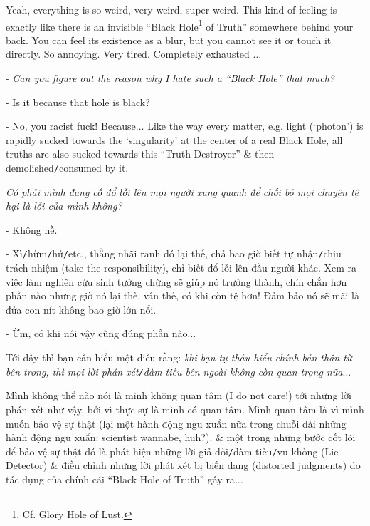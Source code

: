 \documentclass[12pt,oneside]{book}
\begin{document}
Yeah, everything is so weird, very weird, super weird. This kind of feeling is exactly like there is an invisible ``Black Hole\footnote{Cf. Glory Hole of {\sc Lust}.} of Truth'' somewhere behind your back. You can feel its existence as a blur, but you cannot see it or touch it directly. So annoying. Very tired. Completely exhausted $\ldots$

- {\it Can you figure out the reason why I hate such a ``Black Hole'' that much?}

- Is it because that hole is black?

- No, you racist fuck! Because$\ldots$ Like the way every matter, e.g. light (`photon') is rapidly sucked towards the `singularity' at the center of a real \href{https://en.wikipedia.org/wiki/Black_hole}{Black Hole}, all truths are also sucked towards this ``Truth Destroyer'' \& then demolished{\tt/}consumed by it.

{\it Có phải mình đang cố đổ lỗi lên mọi người xung quanh để chối bỏ mọi chuyện tệ hại là lỗi của mình không?}

- Không hề.

- Xì{\tt/}hừm{\tt/}hứ{\tt/}etc., thằng nhãi ranh đó lại thế, chả bao giờ biết tự nhận{\tt/}chịu trách nhiệm (take the responsibility), chỉ biết đổ lỗi lên đầu người khác. Xem ra việc làm nghiên cứu sinh tưởng chừng sẽ giúp nó trưởng thành, chín chắn hơn phần nào nhưng giờ nó lại thế, vẫn thế, có khi còn tệ hơn! Đảm bảo nó sẽ mãi là đứa con nít không bao giờ lớn nổi.

- Ừm, có khi nói vậy cũng đúng phần nào$\ldots$

Tới đây thì bạn cần hiểu một điều rằng: {\it khi bạn tự thấu hiểu chính bản thân từ bên trong, thì mọi lời phán xét{\tt/}đàm tiếu bên ngoài không còn quan trọng nữa}$\ldots$

Mình không thể nào nói là mình không quan tâm (I do not care!) tới những lời phán xét như vậy, bởi vì thực sự là mình có quan tâm. Mình quan tâm là vì mình muốn bảo vệ sự thật (lại một hành động ngu xuẩn nữa trong chuỗi dài những hành động ngu xuẩn: scientist wannabe, huh?). \& một trong những bước cốt lõi để bảo vệ sự thật đó là phát hiện những lời giả dối{\tt/}đàm tiếu{\tt/}vu khống (Lie Detector) \& điều chỉnh những lời phát xét bị biến dạng (distorted judgments) do tác dụng của chính cái ``Black Hole of Truth'' gây ra$\ldots$
\end{document}
